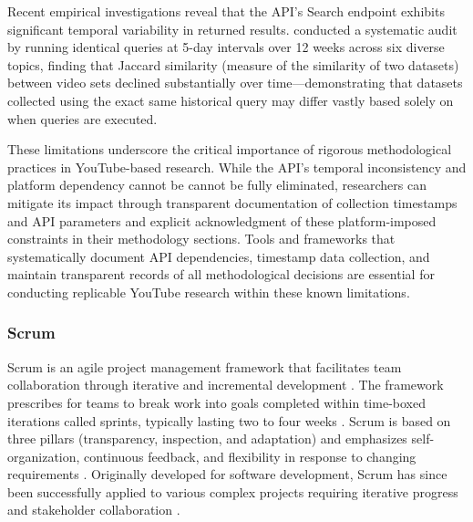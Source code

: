 Recent empirical investigations reveal that the API's Search endpoint exhibits significant temporal variability in returned results. \textcite{efstratiou2025youtube} conducted a systematic audit by running identical queries at 5-day intervals over 12 weeks across six diverse topics, finding that Jaccard similarity (measure of the similarity of two datasets) between video sets declined substantially over time—demonstrating that datasets collected using the exact same historical query may differ vastly based solely on when queries are executed.

These limitations underscore the critical importance of rigorous methodological practices in YouTube-based research. While the API's temporal inconsistency and platform dependency cannot be cannot be fully eliminated, researchers can mitigate its impact through transparent documentation of collection timestamps and API parameters and explicit acknowledgment of these platform-imposed constraints in their methodology sections. Tools and frameworks that systematically document API dependencies, timestamp data collection, and maintain transparent records of all methodological decisions are essential for conducting replicable YouTube research within these known limitations.

\subsubsection{Scrum}

Scrum is an agile project management framework that facilitates team collaboration through iterative and incremental development \parencite{schwaber2020scrum}. The framework prescribes for teams to break work into goals completed within time-boxed iterations called sprints, typically lasting two to four weeks \parencite{schwaber2020scrum}. Scrum is based on three pillars (transparency, inspection, and adaptation) and emphasizes self-organization, continuous feedback, and flexibility in response to changing requirements \parencite{schwaber2020scrum}. Originally developed for software development, Scrum has since been successfully applied to various complex projects requiring iterative progress and stakeholder collaboration \parencite{schwaber2020scrum}.
